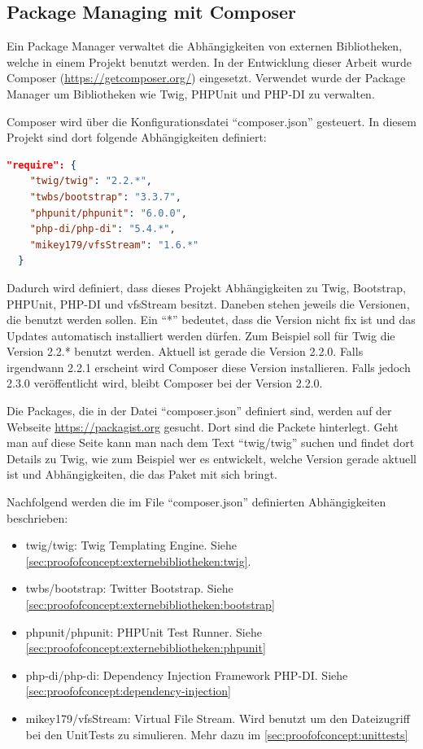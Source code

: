 \subsection{Package Managing mit Composer}
Ein Package Manager verwaltet die Abhängigkeiten von externen Bibliotheken, welche in einem Projekt benutzt werden. In der Entwicklung dieser Arbeit wurde Composer (\url{https://getcomposer.org/}) eingesetzt. Verwendet wurde der Package Manager um Bibliotheken wie Twig, PHPUnit und PHP-DI zu verwalten.

Composer wird über die Konfigurationsdatei "`composer.json"' gesteuert. In diesem Projekt sind dort folgende Abhängigkeiten definiert:

\begin{lstlisting}[language=json]
  "require": {
    "twig/twig": "2.2.*",
    "twbs/bootstrap": "3.3.7",
    "phpunit/phpunit": "6.0.0",
    "php-di/php-di": "5.4.*",
    "mikey179/vfsStream": "1.6.*"
  }
\end{lstlisting}

Dadurch wird definiert, dass dieses Projekt Abhängigkeiten zu Twig, Bootstrap, PHPUnit, PHP-DI und vfsStream besitzt. Daneben stehen jeweils die Versionen, die benutzt werden sollen. Ein "`*"' bedeutet, dass die Version nicht fix ist und das Updates automatisch installiert werden dürfen. Zum Beispiel soll für Twig die Version 2.2.* benutzt werden. Aktuell ist gerade die Version 2.2.0. Falls irgendwann 2.2.1 erscheint wird Composer diese Version installieren. Falls jedoch 2.3.0 veröffentlicht wird, bleibt Composer bei der Version 2.2.0. 

Die Packages, die in der Datei "`composer.json"' definiert sind, werden auf der Webseite \url{https://packagist.org} gesucht. Dort sind die Packete hinterlegt. Geht man auf diese Seite kann man nach dem Text "`twig/twig"' suchen und findet dort Details zu Twig, wie zum Beispiel wer es entwickelt, welche Version gerade aktuell ist und Abhängigkeiten, die das Paket mit sich bringt.

Nachfolgend werden die im File "`composer.json"' definierten Abhängigkeiten beschrieben:
\begin{itemize}
	\item twig/twig: Twig Templating Engine. Siehe \cref{sec:proofofconcept:externebibliotheken:twig}.
	\item twbs/bootstrap: Twitter Bootstrap. Siehe \cref{sec:proofofconcept:externebibliotheken:bootstrap}
	\item phpunit/phpunit: PHPUnit Test Runner. Siehe \cref{sec:proofofconcept:externebibliotheken:phpunit}
	\item php-di/php-di: Dependency Injection Framework PHP-DI. Siehe \cref{sec:proofofconcept:dependency-injection}
	\item mikey179/vfsStream: Virtual File Stream. Wird benutzt um den Dateizugriff bei den UnitTests zu simulieren. Mehr dazu im \cref{sec:proofofconcept:unittests} 
\end{itemize}

